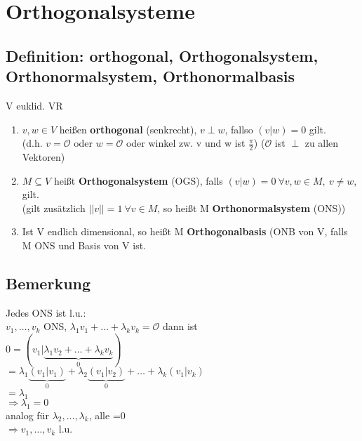  


\section{Orthogonalsysteme}

\subsection{Definition: orthogonal, Orthogonalsystem, Orthonormalsystem, Orthonormalbasis}
V euklid. VR
\begin{enumerate}
\item
$v,w \in V$ heißen \textbf{orthogonal} (senkrecht), $v \perp w$, fallso $(v|w)=0$ gilt.\\
(d.h. $v=\mathcal{O}$ oder $w=\mathcal{O}$ oder winkel zw. v und w ist $\frac{\pi}{2}$) ($\mathcal{O}$ ist $\perp$ zu allen Vektoren)

\item
$M\subseteq V$ heißt \textbf{Orthogonalsystem} (OGS), falls $(v|w)=0 \ \forall v,w \in M, \ v\neq w$, gilt.\\
(gilt zusätzlich $||v||=1 \ \forall v\in M$, so heißt M \textbf{Orthonormalsystem} (ONS))

\item
Ist V endlich dimensional, so heißt M \textbf{Orthogonalbasis} (ONB von V, falls M ONS und Basis von V ist.
\end{enumerate}

\subsection{Bemerkung}
Jedes ONS ist l.u.:\\
$v_1,\dots,v_k$ ONS, $\lambda_1v_1+\dots+\lambda_kv_k=\mathcal{O}$
dann ist\\
$0 = (v_1|\underbrace{\lambda_1v_2+\dots+\lambda_kv_k}_0) $\\
$= \lambda_1\underbrace{(v_1|v_1)}_0 + \lambda_2\underbrace{(v_1|v_2)}_0+\dots+\lambda_k(v_1|v_k)$\\
$ = \lambda_1$\\
$\Rightarrow \lambda_1=0$\\
analog für $\lambda_2,\dots,\lambda_k$, alle =0\\
$\Rightarrow v_1,\dots,v_k$ l.u.

